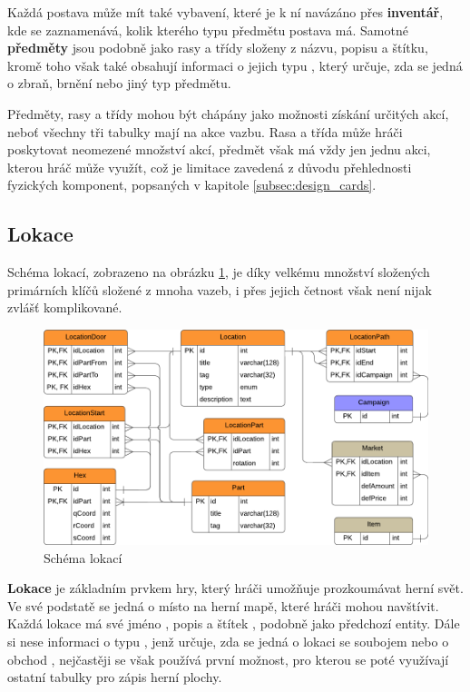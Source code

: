 Každá postava může mít také vybavení, které je k ní navázáno přes \textbf{inventář}, kde se zaznamenává, kolik kterého typu předmětu postava má. Samotné \textbf{předměty} jsou podobně jako rasy a třídy složeny z názvu, popisu a štítku, kromě toho však také obsahují informaci o jejich typu , který určuje, zda se jedná o zbraň, brnění nebo jiný typ předmětu.

Předměty, rasy a třídy mohou být chápány jako možnosti získání určitých akcí, neboť všechny tři tabulky mají na akce vazbu. Rasa a třída může hráči poskytovat neomezené množství akcí, předmět však má vždy jen jednu akci, kterou hráč může využít, což je limitace zavedená z důvodu přehlednosti fyzických komponent, popsaných v kapitole \ref{subsec:design_cards}.

\subsection{Lokace}
\label{subsec:schema_location}

Schéma lokací, zobrazeno na obrázku \ref{diag:er_location}, je díky velkému množství složených primárních klíčů složené z mnoha vazeb, i přes jejich četnost však není nijak zvlášť komplikované.

\begin{figure}[h]
    \centering
    \includegraphics{../../shared/diagrams/er_location.pdf}
    \caption{Schéma lokací}
    \label{diag:er_location}
\end{figure}

\textbf{Lokace}  je základním prvkem hry, který hráči umožňuje prozkoumávat herní svět. Ve své podstatě se jedná o místo na herní mapě, které hráči mohou navštívit. Každá lokace má své jméno , popis  a štítek , podobně jako předchozí entity. Dále si nese informaci o typu , jenž určuje, zda se jedná o lokaci se soubojem  nebo o obchod , nejčastěji se však používá první možnost, pro kterou se poté využívají ostatní tabulky pro zápis herní plochy.

